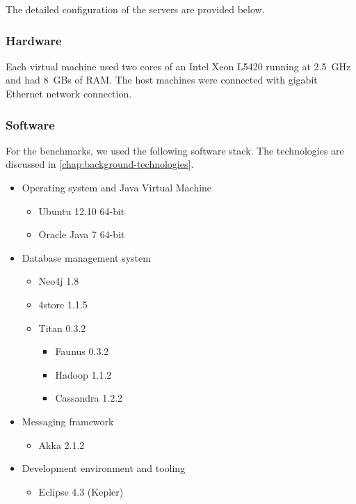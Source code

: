 The detailed configuration of the servers are provided below.

\subsubsection{Hardware}
 
Each virtual machine used two cores of an Intel Xeon L5420 running at 2.5~GHz and had 8~GBs of RAM. The host machines were connected with gigabit Ethernet network connection.

\subsubsection{Software}

For the benchmarks, we used the following software stack. The technologies are discussed in \autoref{chap:background-technologies}.

\begin{itemize}
  \item Operating system and Java Virtual Machine
  \begin{itemize}
    \item Ubuntu 12.10 64-bit
    \item Oracle Java 7 64-bit
  \end{itemize}  
  
  \item Database management system
  \begin{itemize}
    \item Neo4j 1.8
    \item 4store 1.1.5
    \item Titan 0.3.2
    \begin{itemize}
      \item Faunus 0.3.2
      \item Hadoop 1.1.2
      \item Cassandra 1.2.2
    \end{itemize}
  \end{itemize}  

  \item Messaging framework
  \begin{itemize}
    \item Akka 2.1.2
  \end{itemize}  

  \item Development environment and tooling 
  \begin{itemize}
    \item Eclipse 4.3 (Kepler)
  \end{itemize}  
\end{itemize}

